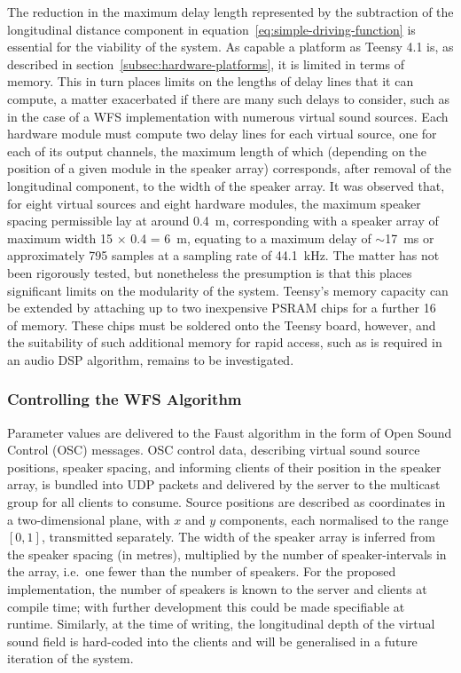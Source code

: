 \documentclass[utf8]{FrontiersinHarvard}
\newcommand{\secref}[1]{section~\ref{#1}}
\begin{document}
    The reduction in the maximum delay length represented by the subtraction of
    the longitudinal distance component in
    equation~\eqref{eq:simple-driving-function} is essential for the viability of
    the system.
    As capable a platform as Teensy 4.1 is, as described in
    \secref{subsec:hardware-platforms}, it is limited in terms of memory.
    This in turn places limits on the lengths of delay lines that it can compute,
    a matter exacerbated if there are many such delays to consider, such as in the
    case of a WFS implementation with numerous virtual sound sources.
    Each hardware module must compute two delay lines for each virtual source, one
    for each of its output channels, the maximum length of which (depending on
    the position of a given module in the speaker array) corresponds, after removal
    of the longitudinal component, to the width of the speaker array.
    It was observed that, for eight virtual sources and eight hardware modules,
    the maximum speaker spacing permissible lay at around \qty{.4}{\m},
    corresponding with a speaker array of maximum width 15 $\times$ 0.4 =
    \qty{6}{\m}, equating to a maximum delay of $\sim$\qty{17}{\ms} or
    approximately 795 samples at a sampling rate of \qty{44.1}{\kHz}.
    The matter has not been rigorously tested, but nonetheless the presumption is
    that this places significant limits on the modularity of the system.
    Teensy's memory capacity can be extended by attaching up to two inexpensive
    PSRAM chips for a further \qty{16}{\mega\byte} of memory.
    These chips must be soldered onto the Teensy board, however, and the suitability
    of such additional memory for rapid access, such as is required in an audio DSP
    algorithm, remains to be investigated.

    \subsubsection{Controlling the WFS Algorithm}

    Parameter values are delivered to the Faust algorithm in the form of Open Sound
    Control (OSC) messages.
    OSC control data, describing virtual sound source positions, speaker spacing,
    and informing clients of their position in the speaker array, is bundled into
    UDP packets and delivered by the server to the multicast group for all clients
    to consume.
    Source positions are described as coordinates in a two-dimensional plane, with
    $x$ and $y$ components, each normalised to the range $[0,1]$, transmitted
    separately.
    The width of the speaker array is inferred from the speaker spacing (in
    metres), multiplied by the number of speaker-intervals in the array, i.e.\ one
    fewer than the number of speakers.
    For the proposed implementation, the number of speakers is known to the server
    and clients at compile time; with further development this could be made
    specifiable at runtime.
    Similarly, at the time of writing, the longitudinal depth of the virtual
    sound field is hard-coded into the clients and will be generalised in a future
    iteration of the system.
\end{document}
